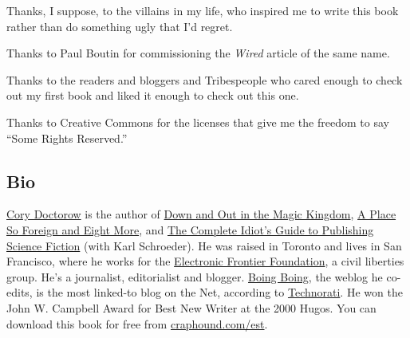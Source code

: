 Thanks, I suppose, to the villains in my life, who inspired me to
write this book rather than do something ugly that I’d regret.

Thanks to Paul Boutin for commissioning the \emph{Wired} article of
the same name.

Thanks to the readers and bloggers and Tribespeople who cared
enough to check out my first book and liked it enough to check out
this one.

Thanks to Creative Commons for the licenses that give me the
freedom to say “Some Rights Reserved.”

\subsection{Bio}

\href{http://craphound.com/}{Cory Doctorow} is the author of
\href{http://craphound.com/down}{Down and Out in the Magic Kingdom},
\href{http://craphound.com/place}{A Place So Foreign and Eight More},
and
\href{http://craphound.com/nonfic/cigpsf.html}{The Complete Idiot’s Guide to Publishing Science Fiction}
(with Karl Schroeder). He was raised in Toronto and lives in San
Francisco, where he works for the
\href{http://www.eff.org/}{Electronic Frontier Foundation}, a civil
liberties group. He’s a journalist, editorialist and blogger.
\href{http://boingboing.net/}{Boing Boing}, the weblog he co-edits,
is the most linked-to blog on the Net, according to
\href{http://technorati.com/}{Technorati}. He won the John W.
Campbell Award for Best New Writer at the 2000 Hugos. You can
download this book for free from
\href{http://craphound.com/est}{craphound.com/est}.


